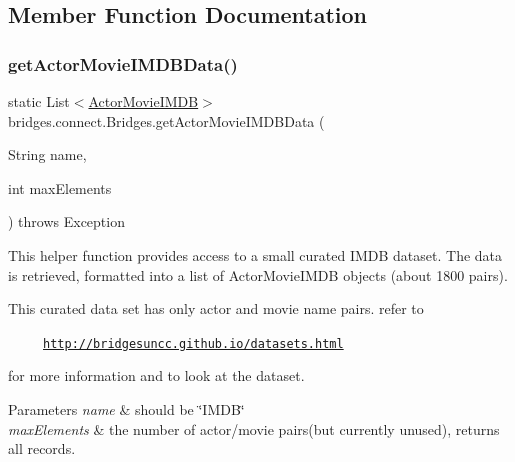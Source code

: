 \subsection{Member Function Documentation}
\mbox{\label{classbridges_1_1connect_1_1_bridges_a242eb7b513790bf285f7996bd7493663}} 
\subsubsection{\texorpdfstring{get\+Actor\+Movie\+I\+M\+D\+B\+Data()}{getActorMovieIMDBData()}}
{\footnotesize\ttfamily static List$<$\mbox{\hyperlink{classbridges_1_1data__src__dependent_1_1_actor_movie_i_m_d_b}{Actor\+Movie\+I\+M\+DB}}$>$ bridges.\+connect.\+Bridges.\+get\+Actor\+Movie\+I\+M\+D\+B\+Data (\begin{DoxyParamCaption}\item[{String}]{name,  }\item[{int}]{max\+Elements }\end{DoxyParamCaption}) throws Exception\hspace{0.3cm}{\ttfamily [static]}}

This helper function provides access to a small curated I\+M\+DB dataset. The data is retrieved, formatted into a list of Actor\+Movie\+I\+M\+DB objects (about 1800 pairs).

This curated data set has only actor and movie name pairs. refer to 

~~~~~\href{http://bridgesuncc.github.io/datasets.html}{\tt http\+://bridgesuncc.\+github.\+io/datasets.\+html} 

for more information and to look at the dataset.


\begin{DoxyParams}{Parameters}
{\em name} & should be \char`\"{}\+I\+M\+D\+B\char`\"{} \\
\hline
{\em max\+Elements} & the number of actor/movie pairs(but currently unused), returns all records. \\
\hline
\end{DoxyParams}

